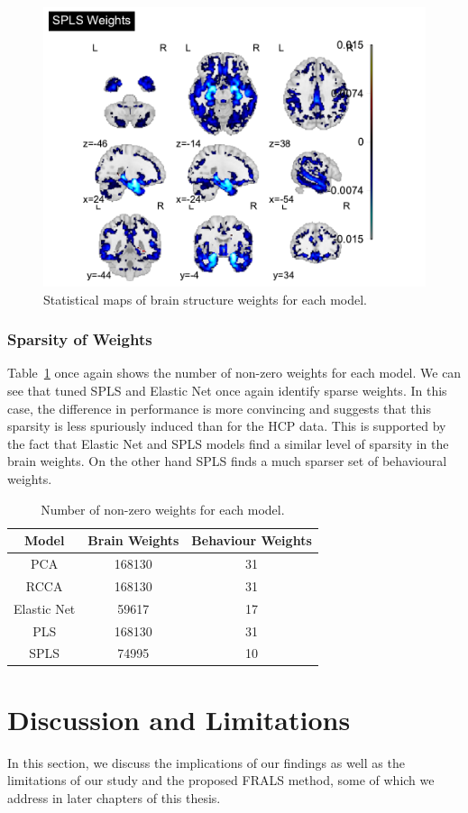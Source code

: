 \begin{figure}
\includegraphics[width=0.45\linewidth]{figures/adni/SPLS brain weights mosaic}
\caption{Statistical maps of brain structure weights for each model.}
\end{figure}

\subsubsection{Sparsity of Weights}

Table~\ref{tab:brain-behaviour-weights-adni} once again shows the number of non-zero \gls{weights} for each model.
We can see that tuned SPLS and Elastic Net once again identify sparse weights.
In this case, the difference in performance is more convincing and suggests that this sparsity is less spuriously induced than for the HCP data.
This is supported by the fact that Elastic Net and SPLS models find a similar level of sparsity in the brain weights.
On the other hand SPLS finds a much sparser set of behavioural weights.

\begin{table}[h]
\centering
\caption{Number of non-zero \gls{weights} for each model.}
\begin{tabular}{|c|c|c|}
\hline
Model & Brain Weights & Behaviour Weights \\
\hline
PCA & 168130 & 31 \\
RCCA & 168130 & 31 \\
Elastic Net & 59617 & 17 \\
PLS & 168130 & 31 \\
SPLS & 74995 & 10 \\
\hline
\end{tabular}\label{tab:brain-behaviour-weights-adni}
\end{table}

\newpage
\newpage
\section{Discussion and Limitations}

In this section, we discuss the implications of our findings as well as the limitations of our study and the proposed FRALS method, some of which we address in later chapters of this thesis.

